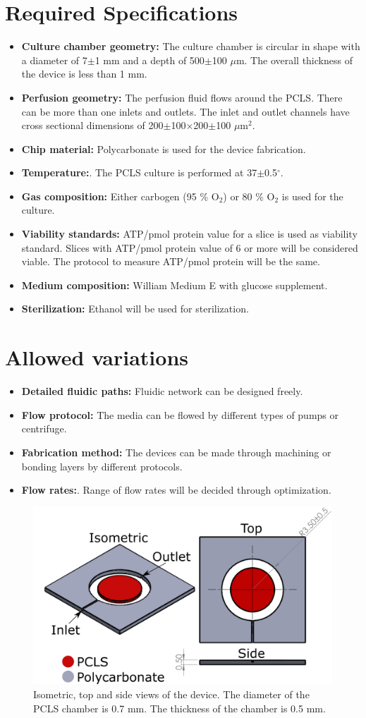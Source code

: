 \documentclass[11pt]{article}
\begin{document}
\section{Required Specifications}
\begin{itemize}
\item \textbf{Culture chamber geometry:} The culture chamber is circular in shape with a diameter of 7$\pm$1 mm and a depth of 500$\pm$100 $\mu$m. The overall thickness of the device is less than 1 mm.
\item \textbf{Perfusion geometry:} The perfusion fluid flows around the PCLS. There can be more than one inlets and outlets. The inlet and outlet channels have cross sectional dimensions of 200$\pm$100$\times$200$\pm$100 $\mu$m$^2$. 
\item \textbf{Chip material:} Polycarbonate is used for the device fabrication.
\item \textbf{Temperature:}. The PCLS culture is performed at 37$\pm$0.5$^{\circ}$.
\item \textbf{Gas composition:} Either carbogen (95 \% O$_2$) or 80 \% O$_2$ is used for the culture.
\item \textbf{Viability standards:} ATP/pmol protein value for a slice is used as viability standard. Slices with ATP/pmol protein value of 6 or more will be considered viable. The protocol to measure ATP/pmol protein will be the same.
\item \textbf{Medium composition:} William Medium E with glucose supplement.
\item \textbf{Sterilization:} Ethanol will be used for sterilization.
\end{itemize}

\section{Allowed variations}
\begin{itemize}
\item \textbf{Detailed fluidic paths:} Fluidic network can be designed freely.
\item \textbf{Flow protocol:} The media can be flowed by different types of pumps or centrifuge. 
\item \textbf{Fabrication method:} The devices can be made through machining or bonding layers by different protocols.
\item \textbf{Flow rates:}. Range of flow rates will be decided through optimization.
\end{itemize}

\begin{figure}
\centering
\includegraphics[width=.8\linewidth,keepaspectratio=true]{./device/tisumr-device.png}
\caption{Isometric, top and side views of the device. The diameter of the PCLS chamber is 0.7 mm. The thickness of the chamber is 0.5 mm.}
\label{fig:tisumr-device}
\end{figure}
\end{document}
